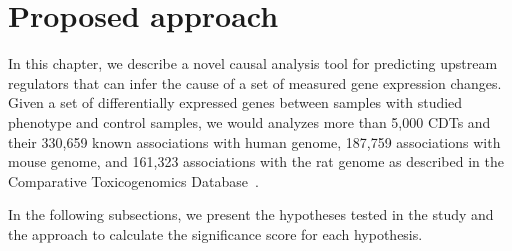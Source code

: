 \section{Proposed approach}



\label{chap:PURE}



In this chapter, we describe a novel causal analysis tool for predicting upstream regulators that can infer the cause of a set of measured gene expression changes. 
Given a set of differentially expressed genes between samples with studied phenotype and control samples, we would analyzes more  than 5,000 CDTs and their 330,659 known associations with human genome, 187,759 associations with mouse genome, and 161,323 associations with the rat genome as described in the Comparative Toxicogenomics Database~\cite{mattingly2006comparative}. 
 
 
In the following subsections, we present the hypotheses tested in the study and the approach to calculate the significance score for each hypothesis.


